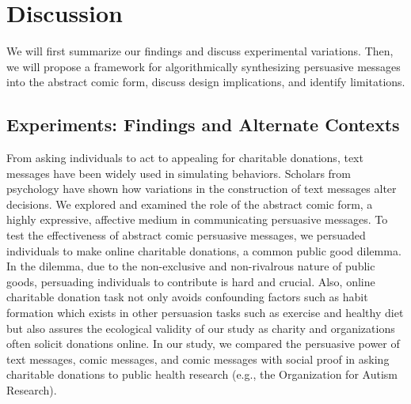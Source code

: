 \section{Discussion}
\label{sec:Discussion}
We will first summarize our findings and discuss experimental variations. Then, we will propose a framework for algorithmically synthesizing persuasive messages into the abstract comic form, discuss design implications, and identify limitations.

\subsection{Experiments: Findings and Alternate Contexts}
\label{sub:Experiments: Findings and Alternate Contexts}

From asking individuals to act to appealing for charitable donations, text messages have been widely used in simulating behaviors. Scholars from psychology have shown how variations in the construction of text messages alter decisions. We explored and examined the role of the abstract comic form, a highly expressive, affective medium in communicating persuasive messages. To test the effectiveness of abstract comic persuasive messages, we persuaded individuals to make online charitable donations, a common public good dilemma. In the dilemma, due to the non-exclusive and non-rivalrous nature of public goods, persuading individuals to contribute is hard and crucial. Also, online charitable donation task not only avoids confounding factors such as habit formation which exists in other persuasion tasks such as exercise and healthy diet but also assures the ecological validity of our study as charity and organizations often solicit donations online. In our study, we compared the persuasive power of text messages, comic messages, and comic messages with social proof in asking charitable donations to public health research (e.g., the Organization for Autism Research).

